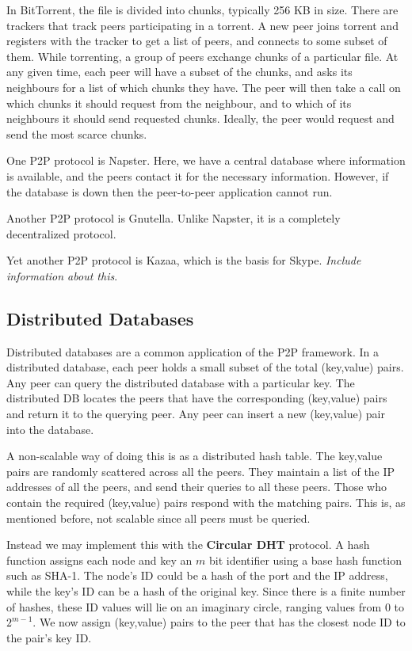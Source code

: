 \documentclass[12pt,letterpaper]{article}
\theoremstyle{definition}
\begin{document}
In BitTorrent, the file is divided into chunks, typically 256 KB in size. There are trackers that track peers participating in a torrent. A new peer joins torrent and registers with the tracker to get a list of peers, and connects to some subset of them. While torrenting, a group of peers exchange chunks of a particular file. At any given time, each peer will have a subset of the chunks, and asks its neighbours for a list of which chunks they have. The peer will then take a call on which chunks it should request from the neighbour, and to which of its neighbours it should send requested chunks. Ideally, the peer would request and send the most scarce chunks.

One P2P protocol is Napster. Here, we have a central database where information is available, and the peers contact it for the necessary information. However, if the database is down then the peer-to-peer application cannot run.

Another P2P protocol is Gnutella. Unlike Napster, it is a completely decentralized protocol.

Yet another P2P protocol is Kazaa, which is the basis for Skype. \textit{Include information about this}.

\subsection{Distributed Databases}

Distributed databases are a common application of the P2P framework. In a distributed database, each peer holds a small subset of the total (key,value) pairs. Any peer can query the distributed database with a particular key. The distributed DB locates the peers that have the corresponding (key,value) pairs and return it to the querying peer. Any peer can insert a new (key,value) pair into the database. 

A non-scalable way of doing this is as a distributed hash table. The key,value pairs are randomly scattered across all the peers. They maintain a list of the IP addresses of all the peers, and send their queries to all these peers. Those who contain the required (key,value) pairs respond with the matching pairs. This is, as mentioned before, not scalable since all peers must be queried.

Instead we may implement this with the \textbf{Circular DHT}  protocol. A hash function assigns each node and key an $m$ bit identifier using a base hash function such as SHA-1. The node's ID could be a hash of the port and the IP address, while the key's ID can be a hash of the original key. Since there is a finite number of hashes, these ID values will lie on an imaginary circle, ranging values from $0$ to $2^{m-1}$. We now assign (key,value) pairs to the peer that has the closest node ID to the pair's key ID.
\end{document}
